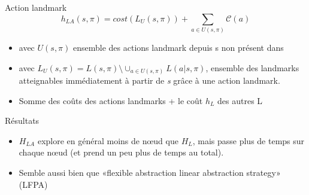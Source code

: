 \begin{frame}
  \begin{block}{Action landmark}
    \begin{displaymath}
      h_{LA}(s, \pi) = cost(L_U(s, \pi)) + \sum_{a\in U(s, \pi)} \mathcal{C}(a)
    \end{displaymath}

    \begin{itemize}
      \item avec $U(s, \pi)$ ensemble des actions landmark depuis s non présent dans \pi
      \item avec $L_U(s, \pi) = L(s, \pi) \setminus \cup_{a \in U(s, \pi)} L(a | s, \pi)$, ensemble des landmarks atteignables immédiatement à partir de \emph{s} grâce à une action landmark.  
      \item Somme des coûts des actions landmarks + le coût $h_L$ des autres L
    \end{itemize}
  \end{block}
\end{frame}

\begin{frame}
  \begin{block}{Résultats}
    \begin{itemize}
      \proitem $\text{LM-A*}<H_{LA}>$ résout plus de tâche que $\text{A*}<H_{LA}>$ (moins rapide pour les petites instances)
      \item $H_{LA}$ explore en général moins de nœud que $H_{L}$, mais passe plus de temps sur chaque nœud (et prend un peu plus de temps au total).
      \item Semble aussi bien que «flexible abstraction linear abstraction strategy» (LFPA)
    \end{itemize}
  \end{block}
\end{frame}

